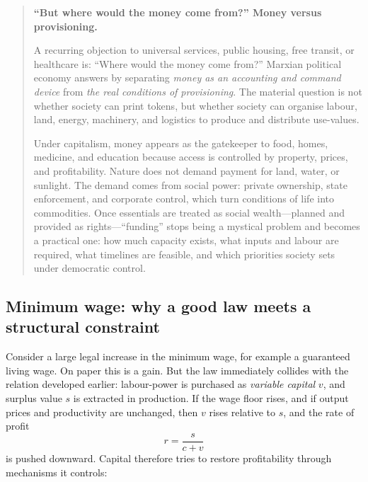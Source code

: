 \begin{quote}
\small
\textbf{``But where would the money come from?'' Money versus provisioning.}%

A recurring objection to universal services, public housing, free transit, or healthcare is:
``Where would the money come from?'' Marxian political economy answers by separating
\emph{money as an accounting and command device} from \emph{the real conditions of provisioning}.
The material question is not whether society can print tokens, but whether society can organise
labour, land, energy, machinery, and logistics to produce and distribute use-values.

Under capitalism, money appears as the gatekeeper to food, homes, medicine, and education because
access is controlled by property, prices, and profitability. Nature does not demand payment for
land, water, or sunlight. The demand comes from social power: private ownership, state enforcement,
and corporate control, which turn conditions of life into commodities. Once essentials are treated as
social wealth---planned and provided as rights---``funding'' stops being a mystical problem and becomes
a practical one: how much capacity exists, what inputs and labour are required, what timelines are
feasible, and which priorities society sets under democratic control.
\end{quote}


\subsection{Minimum wage: why a good law meets a structural constraint}
\label{sec:policy-minimum-wage}

Consider a large legal increase in the minimum wage, for example a guaranteed living wage. On paper this is a gain.
But the law immediately collides with the relation developed earlier: labour-power is purchased as \emph{variable
capital} $v$, and surplus value $s$ is extracted in production. If the wage floor rises, and if output prices and
productivity are unchanged, then $v$ rises relative to $s$, and the rate of profit
\[
  r=\frac{s}{c+v}
\]
is pushed downward. Capital therefore tries to restore profitability through mechanisms it controls:

